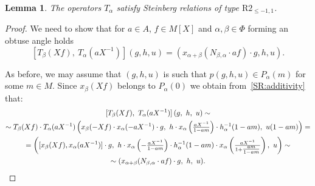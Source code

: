 \documentclass[oneside, 8pt]{amsart}
\newtheorem{lemma}{Lemma}
\theoremstyle{remark}
\theoremstyle{definition}
\numberwithin{equation}{section}
\begin{document}
\begin{lemma} The operators $T_\alpha$ satisfy Steinberg relations of type $\text{R2}_{\leq -1, 1}$. \end{lemma}
\begin{proof} We need to show that for $a\in A$, $f \in M[X]$ and $\alpha, \beta \in \Phi$ forming an obtuse angle holds
 \[ [T_\beta(Xf),\ T_\alpha(aX^{-1})] (g, h, u) = \left(x_{\alpha+\beta}(N_{\beta,\alpha} \cdot af) \cdot g, h, u\right). \]

As before, we may assume that $(g, h, u)$ is such that $p(g, h, u) \in P_\alpha(m)$ for some $m \in M$.
Since $x_\beta(Xf)$ belongs to $P_\alpha(0)$ we obtain from~\cref{SR:additivity} that:
\begin{multline} \nonumber [T_\beta(Xf),\ T_\alpha(aX^{-1})] \left(g,\ h,\ u\right) \sim \\ 
\sim T_\beta(Xf) \cdot T_\alpha(aX^{-1}) \left(x_{\beta}(-Xf) \cdot x_\alpha(-aX^{-1})\cdot g,\ h \cdot x_\alpha\left(\tfrac{aX^{-1}}{1 - am}\right) \cdot h^{-1}_\alpha(1-am),\ u(1-am)\right) = \\ = \left( [x_\beta(Xf), x_\alpha(aX^{-1})] \cdot g,\ h \cdot x_\alpha\left(-\tfrac{aX^{-1}}{1-am}\right) \cdot h^{-1}_\alpha(1-am) \cdot x_\alpha\left(\tfrac{aX^{-1}}{1 + \tfrac{am}{1-am}}\right),\ u \right) \sim \\ \sim (x_{\alpha+\beta}(N_{\beta,\alpha} \cdot af) \cdot g,\ h,\ u). \qedhere \end{multline} \end{proof}
\end{document}
